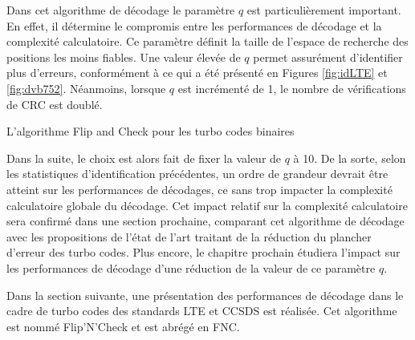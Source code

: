 Dans cet algorithme de décodage le paramètre $q$ est particulièrement important. En effet, il détermine le compromis entre les performances
de décodage et la complexité calculatoire. Ce paramètre définit la taille de l'espace de recherche des positions les moins
fiables. Une valeur élevée de $q$ permet assurément d'identifier plus d'erreurs, conformément à ce qui a été
présenté en Figures \ref{fig:idLTE} et \ref{fig:dvb752}. Néanmoins, lorsque $q$ est incrémenté de 1, le nombre de 
vérifications de CRC est doublé.
\begin{center}
\begin{minipage}{.86\textwidth}%
\begin{algorithm}[H]
\label{alg:fc_b}
	\DontPrintSemicolon
	
	\;
	\caption{L'algorithme Flip and Check pour les turbo codes binaires}
\end{algorithm}
\end{minipage}
\end{center}
Dans la suite, le choix est alors fait de fixer la valeur de $q$ à 10. De la sorte, selon les statistiques d'identification 
précédentes, un ordre de grandeur devrait être atteint sur les performances de décodages, ce sans trop impacter la complexité
calculatoire globale du décodage. Cet impact relatif sur la complexité calculatoire sera confirmé dans une section prochaine,
comparant cet algorithme de décodage avec les propositions de l'état de l'art traitant de la réduction du plancher d'erreur des turbo codes.
Plus encore, le chapitre prochain étudiera l'impact sur les performances de décodage d'une réduction de la valeur de ce paramètre $q$.

Dans la section suivante, une présentation des performances de décodage dans le cadre de turbo codes des standards LTE
et CCSDS est réalisée. Cet algorithme est nommé Flip'N'Check et est abrégé en FNC.



